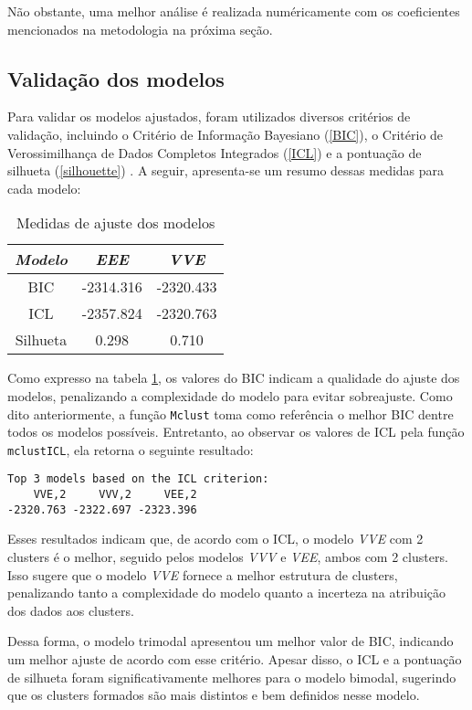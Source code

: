 \documentclass[12pt]{article}
\begin{document}
Não obstante, uma melhor análise é realizada numéricamente com os coeficientes mencionados na metodologia na próxima seção.


\subsection{Validação dos modelos}

Para validar os modelos ajustados, foram utilizados diversos critérios de validação, incluindo o Critério de Informação Bayesiano (\ref{BIC}), o Critério de Verossimilhança de Dados Completos Integrados (\ref{ICL}) e a pontuação de silhueta (\ref{silhouette}) . A seguir, apresenta-se um resumo dessas medidas para cada modelo:

\begin{table}[H]
        \centering
        \begin{tabular}{c|cc}
        \hline
        \textit{Modelo} & \textit{EEE} & \textit{VVE} \\
        \hline
        BIC  & -2314.316 & -2320.433 \\
        ICL & -2357.824 & -2320.763 \\
        Silhueta & 0.298 & 0.710 \\
        \hline
        \end{tabular}
        \caption{Medidas de ajuste dos modelos}\label{fitting}
\end{table}

Como expresso na tabela \ref{fitting}, os valores do BIC indicam a qualidade do ajuste dos modelos, penalizando a complexidade do modelo para evitar sobreajuste. Como dito anteriormente, a função \texttt{Mclust} toma como referência o melhor BIC dentre todos os modelos possíveis. Entretanto, ao observar os valores de ICL pela função \texttt{mclustICL}, ela retorna o seguinte resultado:

\begin{verbatim}
Top 3 models based on the ICL criterion: 
    VVE,2     VVV,2     VEE,2 
-2320.763 -2322.697 -2323.396 
\end{verbatim}

Esses resultados indicam que, de acordo com o ICL, o modelo \textit{VVE} com 2 clusters é o melhor, seguido pelos modelos \textit{VVV} e \textit{VEE}, ambos com 2 clusters. Isso sugere que o modelo \textit{VVE} fornece a melhor estrutura de clusters, penalizando tanto a complexidade do modelo quanto a incerteza na atribuição dos dados aos clusters.

Dessa forma, o modelo trimodal apresentou um melhor valor de BIC, indicando um melhor ajuste de acordo com esse critério. Apesar disso, o ICL e a pontuação de silhueta foram significativamente melhores para o modelo bimodal, sugerindo que os clusters formados são mais distintos e bem definidos nesse modelo.
\end{document}
